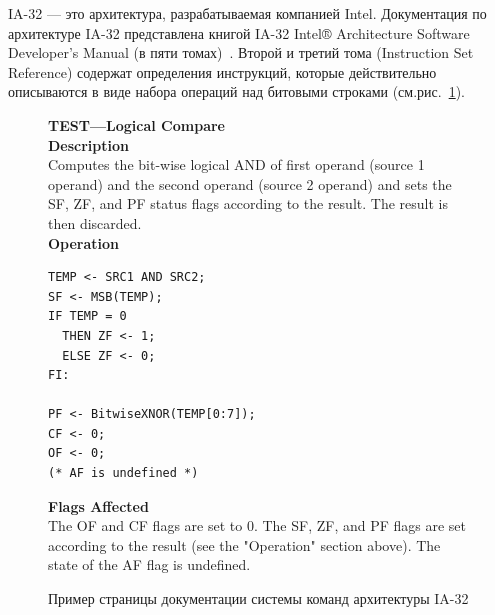 IA-32 --- это архитектура, разрабатываемая компанией Intel. Документация по
архитектуре IA-32 представлена книгой IA-32 Intel® Architecture
Software Developer’s Manual (в пяти томах)~\cite{IA32}. Второй и третий тома (Instruction Set Reference) содержат определения инструкций, которые действительно описываются в виде набора операций над битовыми строками (см.рис.~\ref{fig:ia32_page}).

\begin{figure}
\textbf{TEST—Logical Compare}\\

\textbf{Description}\\
Computes the bit-wise logical AND of first operand (source 1 operand) and the second operand
(source 2 operand) and sets the SF, ZF, and PF status flags according to the result. The result is
then discarded.\\

\textbf{Operation}
\begin{verbatim}
TEMP <- SRC1 AND SRC2;
SF <- MSB(TEMP);
IF TEMP = 0
  THEN ZF <- 1;
  ELSE ZF <- 0;
FI:

PF <- BitwiseXNOR(TEMP[0:7]);
CF <- 0;
OF <- 0;
(* AF is undefined *)
\end{verbatim}

\textbf{Flags Affected}\\
The OF and CF flags are set to 0. The SF, ZF, and PF flags are set according to the result (see
the "Operation" section above). The state of the AF flag is undefined.

\caption{Пример страницы документации системы команд архитектуры IA-32}\label{fig:ia32_page}
\end{figure}


